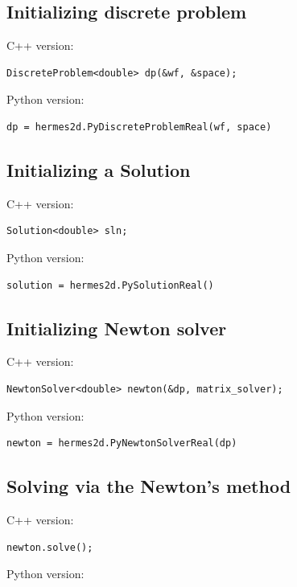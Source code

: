 \documentclass{article}
\begin{document}
\subsection*{Initializing discrete problem}

C++ version:

{\small
\begin{verbatim}
DiscreteProblem<double> dp(&wf, &space);
\end{verbatim}
}
\noindent
Python version:

{\small
\begin{verbatim}
dp = hermes2d.PyDiscreteProblemReal(wf, space)
\end{verbatim}
}

\subsection*{Initializing a Solution}

C++ version:

{\small
\begin{verbatim}
Solution<double> sln;
\end{verbatim}
}
\noindent
Python version:

{\small
\begin{verbatim}
solution = hermes2d.PySolutionReal()
\end{verbatim}
}

\subsection*{Initializing Newton solver}

C++ version:

{\small
\begin{verbatim}
NewtonSolver<double> newton(&dp, matrix_solver);
\end{verbatim}
}
\noindent
Python version:

{\small
\begin{verbatim}
newton = hermes2d.PyNewtonSolverReal(dp)
\end{verbatim}
}

\subsection*{Solving via the Newton's method}

C++ version:

{\small
\begin{verbatim}
newton.solve();
\end{verbatim}
}
\noindent
Python version:
\end{document}
